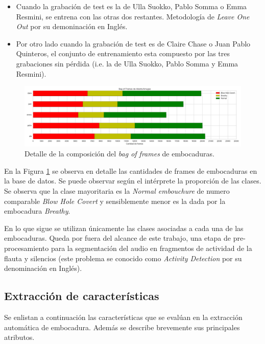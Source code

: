 \documentclass{article}
\begin{document}
\begin{itemize} 
  \item Cuando la grabación de test es la de Ulla Suokko, Pablo Somma o Emma Resmini, se entrena con las otras dos restantes. Metodología de \textit{Leave One Out} por su demoninación en Inglés.
  \item Por otro lado cuando la grabación de test es de Claire Chase o Juan Pablo Quinteros, el conjunto de entrenamiento esta compuesto por las tres grabaciones sin pérdida (i.e. la de Ulla Suokko, Pablo Somma y Emma Resmini).
\end{itemize}

\begin{figure}[H]
\begin{center}
\includegraphics[width=1\textwidth]{dataset} 
\caption{Detalle de la composición del \textit{bag of frames} de embocaduras.}
\label{fig:dataset}
\end{center}
\end{figure}

En la Figura \ref{fig:dataset} se observa en detalle las cantidades de frames de embocaduras en la base de datos. Se puede observar según el intérprete la proporción de las clases. Se observa que la clase mayoritaria es la \textit{Normal embouchure} de numero comparable \textit{Blow Hole Covert} y sensiblemente menor es la dada por la embocadura \textit{Breathy}.

\medskip
En lo que sigue se utilizan únicamente las clases asociadas a cada una de las embocaduras. Queda por fuera del alcance de este trabajo, una etapa de pre-procesamiento para la segmentación del audio en fragmentos de actividad de la flauta y silencios (este problema se conocido como \textit{Activity Detection} por su denominación en Inglés). 
\medskip 


\subsection{Extracción de características}
\label{descriptores}
Se enlistan a continuación las características que se evalúan en la extracción automática de embocadura. Además se describe brevemente sus principales atributos.
\end{document}
